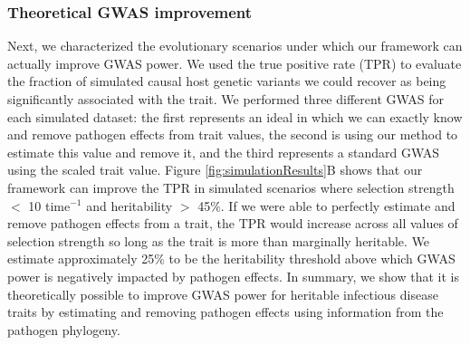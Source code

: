 \documentclass[11pt]{article}
\begin{document}
\begin{linenumbers}
\subsubsection*{Theoretical GWAS improvement}

Next, we characterized the evolutionary scenarios under which our framework can actually improve GWAS power. We used the true positive rate (TPR) to evaluate the fraction of simulated causal host genetic variants we could recover as being significantly associated with the trait. We performed three different GWAS for each simulated dataset: the first represents an ideal in which we can exactly know and remove pathogen effects from trait values, the second is using our method to estimate this value and remove it, and the third represents a standard GWAS using the scaled trait value. Figure \ref{fig:simulationResults}B shows that our framework can improve the TPR in simulated scenarios where selection strength $<$ 10 time$^{-1}$ and heritability $>$ 45\%. If we were able to perfectly estimate and remove pathogen effects from a trait, the TPR would increase across all values of selection strength so long as the trait is more than marginally heritable. We estimate approximately 25\% to be the heritability threshold above which GWAS power is negatively impacted by pathogen effects. In summary, we show that it is theoretically possible to improve GWAS power for heritable infectious disease traits by estimating and removing pathogen effects using information from the pathogen phylogeny.



\end{linenumbers}
\end{document}
